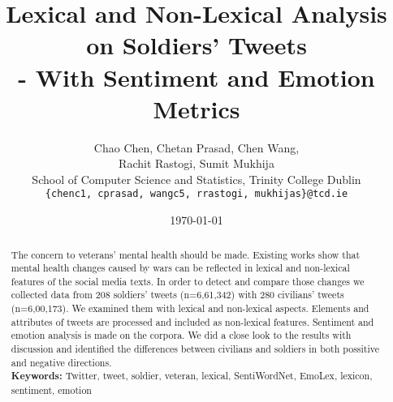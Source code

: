 \documentclass[english,a4paper,11pt]{article}
\title{Lexical and Non-Lexical Analysis on Soldiers' Tweets\\- With Sentiment and Emotion Metrics}
\date{\today}
\author{
  Chao Chen, Chetan Prasad, Chen Wang, \\
  Rachit Rastogi, Sumit Mukhija \\
  School of Computer Science and Statistics, Trinity College Dublin\\
  \texttt{\{chenc1, cprasad, wangc5, rrastogi, mukhijas\}@tcd.ie}
}
\begin{document}
\maketitle
\thispagestyle{empty}
\pagestyle{empty}

\begin{abstract}
  The concern to veterans' mental health should be made. Existing works show that mental health changes caused by wars can be reflected in lexical and non-lexical features of the social media texts. In order to detect and compare those changes we collected data from 208 soldiers' tweets (n=6,61,342) with 280 civilians' tweets (n=6,00,173). We examined them with lexical and non-lexical aspects. Elements and attributes of tweets are processed and included as non-lexical features. Sentiment and emotion analysis is made on the corpora. We did a close look to the results with discussion and identified the differences between civilians and soldiers in both possitive and negative directions. \\
  \textbf{Keywords:} Twitter, tweet, soldier, veteran, lexical, SentiWordNet, EmoLex, lexicon, sentiment, emotion
\end{abstract}








\clearpage



\end{document}
